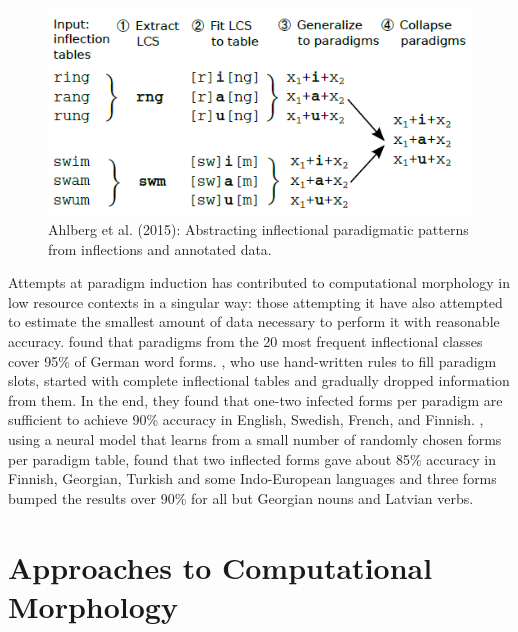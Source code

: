 \documentclass[12pt]{article}
\begin{document}
\begin{figure}[ht]
\label{fig:LCS}
\begin{center}
\includegraphics[width=0.7\columnwidth]{Ahlberg2015-LCS.PNG}
\caption{Ahlberg et al. (2015): Abstracting inflectional paradigmatic patterns from inflections and annotated data.}
\end{center}
\end{figure}

Attempts at paradigm induction has contributed to computational morphology in low resource  contexts in a singular way: those attempting it have also attempted to estimate the smallest amount of data necessary to perform it with reasonable accuracy.  found that paradigms from the 20 most frequent inflectional classes cover 95\% of German word forms. , who use hand-written rules to fill paradigm slots, started with complete inflectional tables and gradually dropped information from them. In the end, they found that one-two infected forms per paradigm are sufficient to achieve 90\% accuracy in English, Swedish, French, and Finnish. , using a neural model that learns from a small number of randomly chosen forms per paradigm table, found that two inflected forms gave about 85\% accuracy in Finnish, Georgian, Turkish and some Indo-European languages and three forms bumped the results over 90\% for all but Georgian nouns and Latvian verbs.

\section{Approaches to Computational Morphology}
\label{compMorph}
\end{document}
